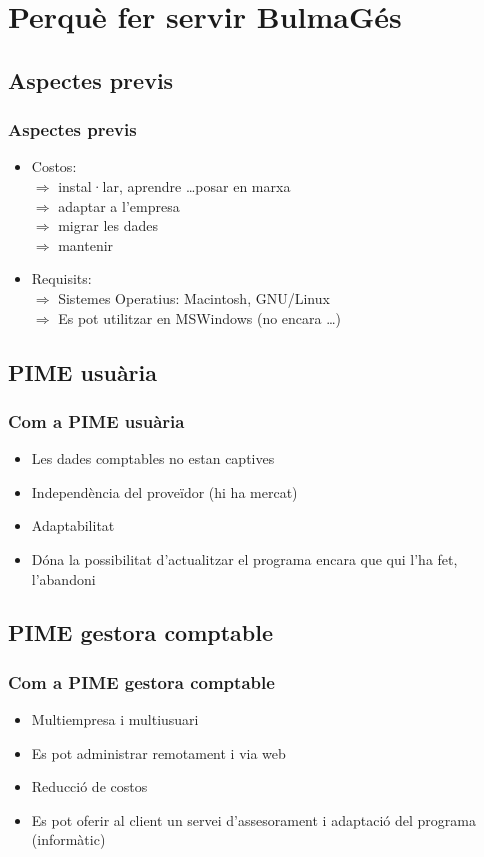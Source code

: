 \documentclass{beamer}
\begin{document}
\section{Perquè fer servir BulmaGés}
\subsection{Aspectes previs}
\begin{frame}\frametitle{Aspectes previs} 
\begin{itemize}
\item Costos: \\
 $\Rightarrow$ instal·lar, aprendre \dots posar en marxa \\
 $\Rightarrow$ adaptar a l'empresa \\
 $\Rightarrow$ migrar les dades \\
 $\Rightarrow$ mantenir
\item Requisits: \\
 $\Rightarrow$ Sistemes Operatius: Macintosh, GNU/Linux \\
 $\Rightarrow$ Es pot utilitzar en MSWindows (no encara \dots )
\end{itemize}
\end{frame}

\subsection{PIME usuària}
\begin{frame}\frametitle{Com a PIME usuària} 
\begin{itemize}
\item Les dades comptables no estan captives
\item Independència del proveïdor (hi ha mercat)
\item Adaptabilitat
\item Dóna la possibilitat d'actualitzar el programa encara que qui l'ha fet, l'abandoni
\end{itemize}
\end{frame}

\subsection{PIME gestora comptable}
\begin{frame}\frametitle{Com a PIME gestora comptable} 
\begin{itemize}
\item Multiempresa i multiusuari
\item Es pot administrar remotament i via web
\item Reducció de costos
\item Es pot oferir al client un servei d'assesorament i adaptació del programa (informàtic)
\end{itemize}
\end{frame}
\end{document}
